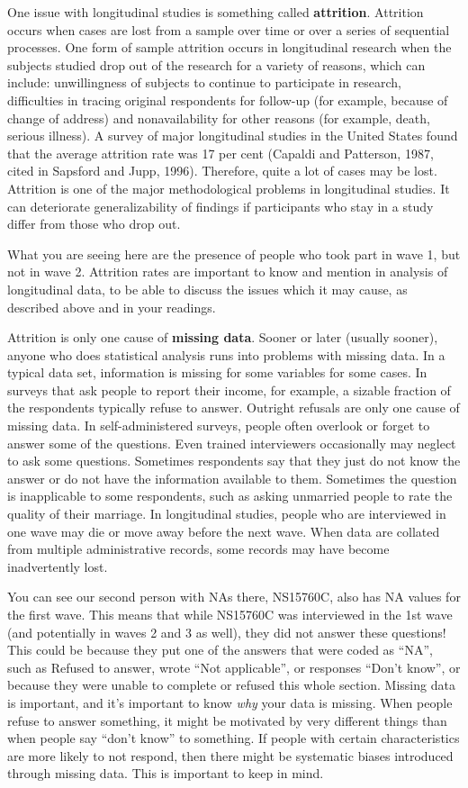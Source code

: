 \documentclass[]{book}
\theoremstyle{definition}
\theoremstyle{definition}
\theoremstyle{definition}
\theoremstyle{remark}
\begin{document}
One issue with longitudinal studies is something called
\textbf{attrition}. Attrition occurs when cases are lost from a sample
over time or over a series of sequential processes. One form of sample
attrition occurs in longitudinal research when the subjects studied drop
out of the research for a variety of reasons, which can include:
unwillingness of subjects to continue to participate in research,
difficulties in tracing original respondents for follow-up (for example,
because of change of address) and nonavailability for other reasons (for
example, death, serious illness). A survey of major longitudinal studies
in the United States found that the average attrition rate was 17 per
cent (Capaldi and Patterson, 1987, cited in Sapsford and Jupp, 1996).
Therefore, quite a lot of cases may be lost. Attrition is one of the
major methodological problems in longitudinal studies. It can
deteriorate generalizability of findings if participants who stay in a
study differ from those who drop out.

What you are seeing here are the presence of people who took part in
wave 1, but not in wave 2. Attrition rates are important to know and
mention in analysis of longitudinal data, to be able to discuss the
issues which it may cause, as described above and in your readings.

Attrition is only one cause of \textbf{missing data}. Sooner or later
(usually sooner), anyone who does statistical analysis runs into
problems with missing data. In a typical data set, information is
missing for some variables for some cases. In surveys that ask people to
report their income, for example, a sizable fraction of the respondents
typically refuse to answer. Outright refusals are only one cause of
missing data. In self-administered surveys, people often overlook or
forget to answer some of the questions. Even trained interviewers
occasionally may neglect to ask some questions. Sometimes respondents
say that they just do not know the answer or do not have the information
available to them. Sometimes the question is inapplicable to some
respondents, such as asking unmarried people to rate the quality of
their marriage. In longitudinal studies, people who are interviewed in
one wave may die or move away before the next wave. When data are
collated from multiple administrative records, some records may have
become inadvertently lost.

You can see our second person with NAs there, NS15760C, also has NA
values for the first wave. This means that while NS15760C was
interviewed in the 1st wave (and potentially in waves 2 and 3 as well),
they did not answer these questions! This could be because they put one
of the answers that were coded as ``NA'', such as Refused to answer,
wrote ``Not applicable'', or responses ``Don't know'', or because they
were unable to complete or refused this whole section. Missing data is
important, and it's important to know \emph{why} your data is missing.
When people refuse to answer something, it might be motivated by very
different things than when people say ``don't know'' to something. If
people with certain characteristics are more likely to not respond, then
there might be systematic biases introduced through missing data. This
is important to keep in mind.
\end{document}
